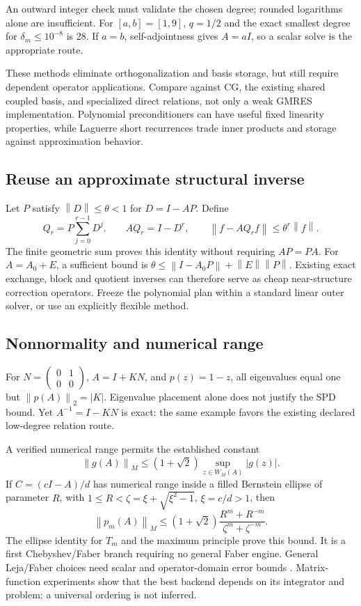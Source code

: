 \documentclass[aps,pra,reprint,onecolumn,11pt,notitlepage,nofootinbib]{revtex4-2}
\newcommand{\norm}[1]{\left\|#1\right\|}
\begin{document}
An outward integer check must validate the chosen degree; rounded logarithms
alone are insufficient. For $[a,b]=[1,9]$, $q=1/2$ and the exact smallest
degree for $\delta_m\le10^{-8}$ is 28. If $a=b$, self-adjointness gives
$A=aI$, so a scalar solve is the appropriate route.

These methods eliminate orthogonalization and basis storage, but still
require dependent operator applications. Compare against CG, the existing
shared coupled basis, and specialized direct relations, not only a weak
GMRES implementation. Polynomial preconditioners can have useful fixed
linearity properties\cite{wathen}, while Laguerre short recurrences trade
inner products and storage against approximation behavior\cite{laguerre}.

\subsection{Reuse an approximate structural inverse}
Let $P$ satisfy $\norm{D}\le\theta<1$ for $D=I-AP$. Define
\begin{equation}
 Q_r=P\sum_{j=0}^{r-1}D^j .
 \qquad AQ_r=I-D^r,
 \qquad \norm{f-AQ_rf}\le\theta^r\norm{f}.
\end{equation}
The finite geometric sum proves this identity without requiring $AP=PA$.
For $A=A_0+E$, a sufficient bound is
$\theta\le\norm{I-A_0P}+\norm{E}\norm{P}$.
Existing exact exchange, block and quotient inverses can therefore serve as
cheap near-structure correction operators. Freeze the polynomial plan
within a standard linear outer solver, or use an explicitly flexible method.

\subsection{Nonnormality and numerical range}
For $N=\left(\begin{smallmatrix}0&1\\0&0\end{smallmatrix}\right)$,
$A=I+KN$, and $p(z)=1-z$, all eigenvalues equal one but
$\norm{p(A)}_2=|K|$. Eigenvalue placement alone does not justify the SPD
bound. Yet $A^{-1}=I-KN$ is exact: the same example favors the existing
declared low-degree relation route.

A verified numerical range permits the established constant
\cite{crouzeix}
\begin{equation}
 \norm{g(A)}_M\le(1+\sqrt2)\sup_{z\in W_M(A)}|g(z)|.
\end{equation}
If $C=(cI-A)/d$ has numerical range inside a filled Bernstein ellipse of
parameter $R$, with $1\le R<\zeta=\xi+\sqrt{\xi^2-1}$, $\xi=c/d>1$, then
\begin{equation}
 \norm{p_m(A)}_M\le(1+\sqrt2)
 \frac{R^m+R^{-m}}{\zeta^m+\zeta^{-m}}.
\end{equation}
The ellipse identity for $T_m$ and the maximum principle prove this bound.
It is a first Chebyshev/Faber branch requiring no general Faber engine.
General Leja/Faber choices need scalar and operator-domain error bounds
\cite{leja,faber}. Matrix-function experiments show that the best backend
depends on its integrator and problem\cite{dek}; a universal ordering is
not inferred.
\end{document}
